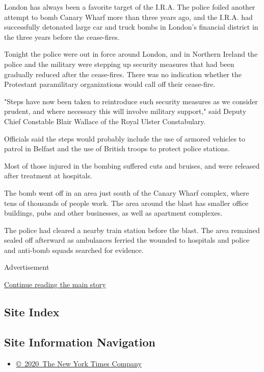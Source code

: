 London has always been a favorite target of the I.R.A. The police foiled
another attempt to bomb Canary Wharf more than three years ago, and the
I.R.A. had successfully detonated large car and truck bombs in London's
financial district in the three years before the cease-fires.

Tonight the police were out in force around London, and in Northern
Ireland the police and the military were stepping up security measures
that had been gradually reduced after the cease-fires. There was no
indication whether the Protestant paramilitary organizations would call
off their cease-fire.

"Steps have now been taken to reintroduce such security measures as we
consider prudent, and where necessary this will involve military
support," said Deputy Chief Constable Blair Wallace of the Royal Ulster
Constabulary.

Officials said the steps would probably include the use of armored
vehicles to patrol in Belfast and the use of British troops to protect
police stations.

Most of those injured in the bombing suffered cuts and bruises, and were
released after treatment at hospitals.

The bomb went off in an area just south of the Canary Wharf complex,
where tens of thousands of people work. The area around the blast has
smaller office buildings, pubs and other businesses, as well as
apartment complexes.

The police had cleared a nearby train station before the blast. The area
remained sealed off afterward as ambulances ferried the wounded to
hospitals and police and anti-bomb squads searched for evidence.

Advertisement

\protect\hyperlink{after-bottom}{Continue reading the main story}

\hypertarget{site-index}{%
\subsection{Site Index}\label{site-index}}

\hypertarget{site-information-navigation}{%
\subsection{Site Information
Navigation}\label{site-information-navigation}}

\begin{itemize}
\tightlist
\item
  \href{https://help.nytimes.com/hc/en-us/articles/115014792127-Copyright-notice}{©~2020~The
  New York Times Company}
\end{itemize}

